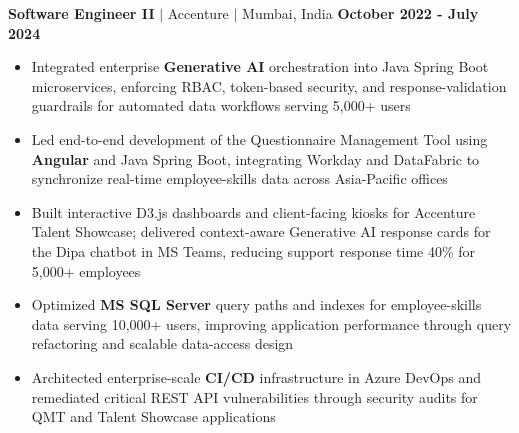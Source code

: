 \documentclass[letterpaper,10pt]{article}
\begin{document}
{\textbf{Software Engineer II} $|$
Accenture $|$
Mumbai, India \hfill \textbf{October 2022 - July 2024}
\begin{itemize}
    \item Integrated enterprise \textbf{Generative AI} orchestration into Java Spring Boot microservices, enforcing RBAC, token-based security, and response-validation guardrails for automated data workflows serving 5,000+ users
    \item Led end-to-end development of the Questionnaire Management Tool using \textbf{Angular} and Java Spring Boot, integrating Workday and DataFabric to synchronize real-time employee-skills data across Asia-Pacific offices
    \item Built interactive D3.js dashboards and client-facing kiosks for Accenture Talent Showcase; delivered context-aware Generative AI response cards for the Dipa chatbot in MS Teams, reducing support response time 40\% for 5,000+ employees
    \item Optimized \textbf{MS SQL Server} query paths and indexes for employee-skills data serving 10,000+ users, improving application performance through query refactoring and scalable data-access design
    \item Architected enterprise-scale \textbf{CI/CD} infrastructure in Azure DevOps and remediated critical REST API vulnerabilities through security audits for QMT and Talent Showcase applications
\end{itemize}}
\end{document}

